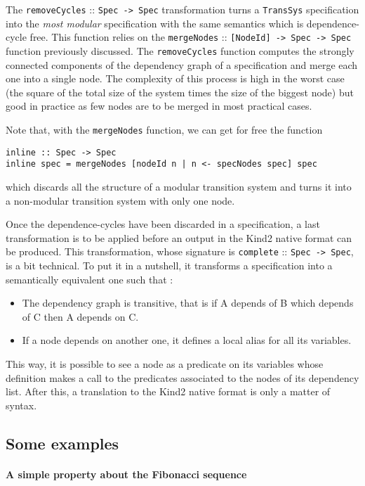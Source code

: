The \texttt{removeCycles} :: \texttt{Spec -> Spec} transformation turns a \texttt{TransSys} specification into the \textit{most modular} specification with the same semantics which is dependence-cycle free. This function relies on the \texttt{mergeNodes} :: \texttt{[NodeId] -> Spec -> Spec} function previously discussed. The \texttt{removeCycles} function computes the strongly connected components of the dependency graph of a specification and merge each one into a single node. The complexity of this process is high in the worst case (the square of the total size of the system times the size of the biggest node) but good in practice as few nodes are to be merged in most practical cases.

Note that, with the \texttt{mergeNodes} function, we can get for free the function
\begin{lstlisting}[frame=single]
inline :: Spec -> Spec
inline spec = mergeNodes [nodeId n | n <- specNodes spec] spec
\end{lstlisting}
which discards all the structure of a modular transition system and turns it into a non-modular transition system with only one node.

\bigskip


Once the dependence-cycles have been discarded in a specification, a last transformation is to be applied before an output in the Kind2 native format can be produced. This transformation, whose signature is  \texttt{complete} :: \texttt{Spec -> Spec}, is a bit technical. To put it in a nutshell, it transforms a specification into a semantically equivalent one such that :

\begin{itemize}
\item The dependency graph is transitive, that is if A depends of B which depends of C then A depends on C.
\item If a node depends on another one, it defines a local alias for all its variables.
\end{itemize}
This way, it is possible to see a node as a predicate on its variables whose definition makes a call to the predicates associated to the nodes of its dependency list. After this, a translation to the Kind2 native format is only a matter of syntax.

\subsection{Some examples}

\paragraph{A simple property about the Fibonacci sequence}

